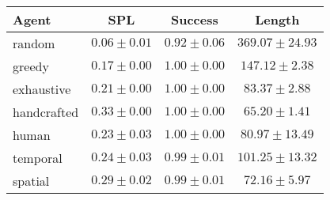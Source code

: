 \begin{tabular}{lccc}
    \toprule
    Agent & SPL & Success & Length \\
    \midrule
    random & $0.06 \pm 0.01$ & $0.92 \pm 0.06$ & $369.07 \pm 24.93$\\
    greedy & $0.17 \pm 0.00$ & $1.00 \pm 0.00$ & $147.12 \pm 2.38$\\
    exhaustive & $0.21 \pm 0.00$ & $1.00 \pm 0.00$ & $83.37 \pm 2.88$\\
    handcrafted & $0.33 \pm 0.00$ & $1.00 \pm 0.00$ & $65.20 \pm 1.41$\\
    human & $0.23 \pm 0.03$ & $1.00 \pm 0.00$ & $80.97 \pm 13.49$\\
    temporal & $0.24 \pm 0.03$ & $0.99 \pm 0.01$ & $101.25 \pm 13.32$\\
    spatial & $0.29 \pm 0.02$ & $0.99 \pm 0.01$ & $72.16 \pm 5.97$\\
    \bottomrule
\end{tabular}
